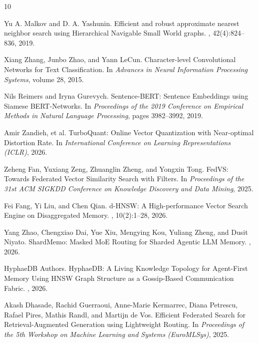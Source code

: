 \documentclass[10pt,twocolumn]{article}
\begin{document}
\begin{thebibliography}{10}

Yu A. Malkov and D. A. Yashunin.
\newblock Efficient and robust approximate nearest neighbor search using Hierarchical Navigable Small World graphs.
, 42(4):824--836, 2019.

Xiang Zhang, Junbo Zhao, and Yann LeCun.
\newblock Character-level Convolutional Networks for Text Classification.
\newblock In {\em Advances in Neural Information Processing Systems}, volume 28, 2015.

Nils Reimers and Iryna Gurevych.
\newblock Sentence-BERT: Sentence Embeddings using Siamese BERT-Networks.
\newblock In {\em Proceedings of the 2019 Conference on Empirical Methods in Natural Language Processing}, pages 3982--3992, 2019.

Amir Zandieh, {et al.}
\newblock TurboQuant: Online Vector Quantization with Near-optimal Distortion Rate.
\newblock In {\em International Conference on Learning Representations (ICLR)}, 2026.

Zeheng Fan, Yuxiang Zeng, Zhuanglin Zheng, and Yongxin Tong.
\newblock FedVS: Towards Federated Vector Similarity Search with Filters.
\newblock In {\em Proceedings of the 31st ACM SIGKDD Conference on Knowledge Discovery and Data Mining}, 2025.

Fei Fang, Yi Liu, and Chen Qian.
\newblock d-HNSW: A High-performance Vector Search Engine on Disaggregated Memory.
, 10(2):1--28, 2026.

Yang Zhao, Chengxiao Dai, Yue Xiu, Mengying Kou, Yuliang Zheng, and Dusit Niyato.
\newblock ShardMemo: Masked MoE Routing for Sharded Agentic LLM Memory.
, 2026.

HyphaeDB Authors.
\newblock HyphaeDB: A Living Knowledge Topology for Agent-First Memory Using HNSW Graph Structure as a Gossip-Based Communication Fabric.
, 2026.

Akash Dhasade, Rachid Guerraoui, Anne-Marie Kermarrec, Diana Petrescu, Rafael Pires, Mathis Randl, and Martijn de Vos.
\newblock Efficient Federated Search for Retrieval-Augmented Generation using Lightweight Routing.
\newblock In {\em Proceedings of the 5th Workshop on Machine Learning and Systems (EuroMLSys)}, 2025.


\end{thebibliography}
\end{document}
